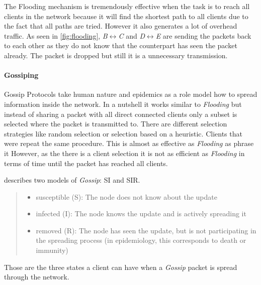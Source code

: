 The Flooding mechanism is tremendously effective when the task is to reach all clients in the network because it will find the shortest path to all clients due to the fact that all paths are tried.
However it also generates a lot of overhead traffic. As seen in \cref{fig:flooding}, \textit{B}$\leftrightarrow$︎\textit{C} and \textit{D}$\leftrightarrow$\textit{E} are sending the packets back to each other as they do not know that the counterpart has seen the packet already. The packet is dropped but still it is a unnecessary transmission.

\paragraph{Gossiping}\label{gossiping}
Gossip Protocols take human nature and epidemics as a role model how to spread information inside the network. 
In a nutshell it works similar to \textit{Flooding} but instead of sharing a packet with all direct connected clients only a subset is selected where the packet is transmitted to. There are different selection strategies like random selection or selection based on a heuristic. 
Clients that were  repeat the same procedure. This is almost as effective as \textit{Flooding} as \citet{riviere_voulgaris_2011} phrase it 
However, as the there is a client selection it is not as efficient as \textit{Flooding} in terms of time until the packet has reached all clients.

\citet{Jelasity2011} describes two models of \textit{Gossip}: SI and SIR. 

\begin{quote}
\begin{itemize}
\item susceptible (S): The node does not know about the update
\item infected (I): The node knows the update and is actively spreading it
\item removed (R): The node has seen the update, but is not participating in the spreading process (in epidemiology, this corresponds to death or immunity)
\end{itemize}
\end{quote}
\cite[\S1.2.2]{Jelasity2011}

Those are the three states a client can have when a \textit{Gossip} packet is spread through the network.

